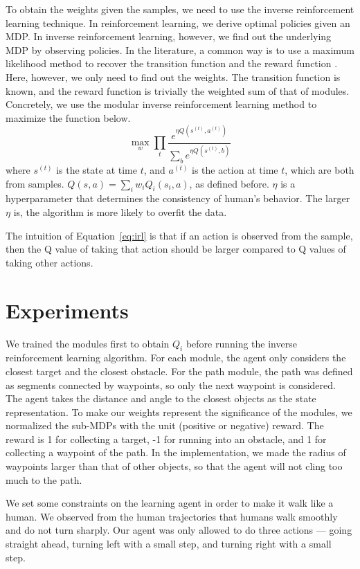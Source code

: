\documentclass[11pt]{article} %
\begin{document}
To obtain the weights given the samples, we need to use the inverse
reinforcement learning technique. In reinforcement learning, we derive 
optimal policies given an MDP. In inverse reinforcement learning, however, we
find out the underlying MDP by observing policies. In the literature, a common
way is to use a maximum likelihood method to recover the transition function and
the reward function \cite{ng2000algorithms}. Here, however, we only need to find
out the weights. The transition function is known, and the reward function is
trivially the weighted sum of that of modules. Concretely, we use the modular
inverse reinforcement learning method \cite{rothkopf2013modular} to maximize the
function below.
\begin{equation}
\label{eq:irl}
\max_w \prod_t \frac{e^{\eta Q(s^{(t)}, a^{(t)})}}{\sum_b e^{\eta Q(s^{(t)}, b)}}
\end{equation}
where $s^{(t)}$ is the state at time $t$, and $a^{(t)}$ is the action at time
$t$, which are both from samples. $Q(s, a) = \sum_i w_i Q_i(s_i, a)$, as defined
before. $\eta$ is a hyperparameter that determines the consistency of human's
behavior. The larger $\eta$ is, the algorithm is more likely to overfit the data.

The intuition of Equation~\ref{eq:irl} is that if an action is observed from the
sample, then the Q value of taking that action should be larger compared to Q
values of taking other actions.

\section{Experiments}
\label{sec:exp}

We trained the modules first to obtain $Q_i$ before running the inverse reinforcement
learning algorithm. For each module, the agent only considers the closest target
and the closest obstacle. For the path module, the path was defined as segments
connected by waypoints, so only the next waypoint is considered. The agent takes the
distance and angle to the closest objects as the state representation. To make our weights represent the significance of the modules, we
normalized the sub-MDPs with the unit (positive or negative) reward. The reward
is 1 for collecting a target, -1 for running into an obstacle, and 1 for
collecting a waypoint of the path. In the implementation, we made the radius of
waypoints larger than that of other objects, so that the agent will not cling
too much to the path.

We set some constraints on the learning agent in order to make it walk like a human.
We observed from the human trajectories that humans walk smoothly and do not turn
sharply.  Our agent was only allowed to do three actions --- going straight ahead,
turning left with a small step, and turning right with a small step.
\end{document}
